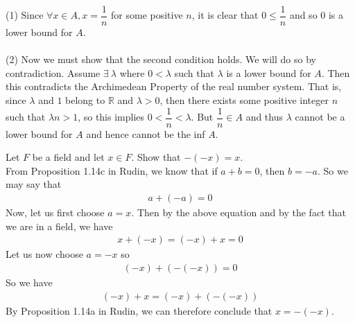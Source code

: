 \documentclass[12pt]{article}
\begin{document}
(1) Since $\forall x \in A, x=\dfrac{1}{n}$ for some positive $n$, it is clear that $0 \leq \dfrac{1}{n}$ and so $0$ is a lower bound for $A$.\\ \\ (2) Now we must show that the second condition holds. We will do so by contradiction. Assume $\exists ~ \lambda$ where  $0 < \lambda$ such that $\lambda$ is a lower bound for $A$. Then this contradicts the Archimedean Property of the real number system. That is, since $\lambda$ and $1$ belong to ${\mathbb{R}}$ and $\lambda > 0$, then there exists some positive integer $n$ such that $\lambda n >1$, so this implies $0 < \dfrac{1}{n} < \lambda$. But $\dfrac{1}{n} \in A$ and thus $\lambda$ cannot be a lower bound for $A$ and hence cannot be the inf $A$.

\problem

Let $F$ be a field and let $x \in F$. Show that $-(-x)=x$.\\ From Proposition 1.14c in Rudin, we know that if $a+b=0$, then $b=-a$. So we may say that \begin{align*}
a+(-a)=0
\end{align*} Now, let us first choose $a=x$. Then by the above equation and by the fact that we are in a field, we have 
\begin{align*}
x+(-x)=(-x)+x=0
\end{align*}
Let us now choose $a=-x$ so 
\begin{align*}
(-x)+(-(-x))=0
\end{align*}
So we have \begin{align*}
(-x)+x=(-x)+(-(-x))
\end{align*}
By Proposition 1.14a in Rudin, we can therefore conclude that $x= -(-x)$.
\end{document}
